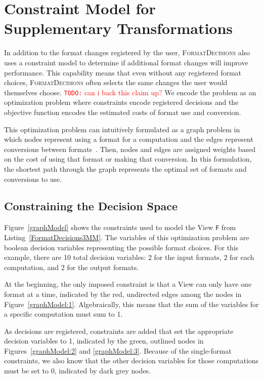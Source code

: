 \documentclass[sigconf,review=true]{acmart}
\newcommand{\todo}[1]{{\textcolor{red}{{\tt{TODO:}}\,\,#1 }}}
\newcommand{\FormatDecisions}[0]{{\textsc{FormatDecisions}}}
\begin{document}
\section{Constraint Model for Supplementary Transformations}

In addition to the format changes registered by the user, \FormatDecisions{} also uses a constraint model to determine if additional format changes will improve performance. 
This capability means that even without any registered format choices, \FormatDecisions{} often selects the same changes the user would themselves choose. \todo{can i back this claim up?}
We encode the problem as an optimization problem where constraints encode registered decisions and the objective function encodes the estimated costs of format use and conversion.

This optimization problem can intuitively formulated as a graph problem in which nodes represent using a format for a computation and the edges represent conversions between formats~\cite{kennedy1998automatic}.
Then, nodes and edges are assigned weights based on the cost of using that format or making that conversion. 
In this formulation, the shortest path through the graph represents the optimal set of formats and conversions to use.

\subsection{Constraining the Decision Space}
Figure~\ref{graphModel} shows the constraints used to model the View \verb.F. from Listing~\ref{FormatDecisions3MM}.
The variables of this optimization problem are boolean decision variables representing the possible format choices. 
For this example, there are 10 total decision variables: 2 for the input formats, 2 for each computation, and 2 for the output formats.

At the beginning, the only imposed constraint is that a View can only have one format at a time, indicated by the red, undirected edges among the nodes in Figure~\ref{graphModel:1}.
Algebraically, this means that the sum of the variables for a specific computation must sum to 1. 

As decisions are registered, constraints are added that set the appropriate decision variables to 1, indicated by the green, outlined nodes in Figures~\ref{graphModel:2} and \ref{graphModel:3}. 
Because of the single-format constraints, we also know that the other decision variables for those computations must be set to 0, indicated by dark grey nodes.
\end{document}
